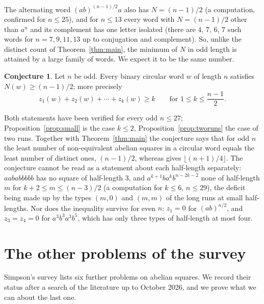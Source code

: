 \documentclass[11pt,reqno]{amsart}
\theoremstyle{definition}
\newtheorem{conjecture}[theorem]{Conjecture}
\newcommand{\fl}[1]{\lfloor #1\rfloor}
\begin{document}
The alternating word $(ab)^{(n-1)/2}a$ also has $N=(n-1)/2$ (a computation, confirmed for $n\le 25$), and for $n\le 13$ every word with $N=(n-1)/2$ other than $a^n$ and its complement has one letter isolated (there are $4$, $7$, $6$, $7$ such words for $n=7,9,11,13$ up to conjugation and complement). So, unlike the distinct count of Theorem~\ref{thm:main}, the minimum of $N$ in odd length is attained by a large family of words. We expect it to be the same number.

\begin{conjecture}\label{conj:odd}
Let $n$ be odd. Every binary circular word $w$ of length $n$ satisfies $N(w)\ge(n-1)/2$; more precisely
\[
z_1(w)+z_2(w)+\cdots+z_k(w)\ge k\qquad\text{for }1\le k\le\frac{n-1}{2}.
\]
\end{conjecture}

Both statements have been verified for every odd $n\le 27$; Proposition~\ref{prop:small} is the case $k\le 2$, Proposition~\ref{prop:tworuns} the case of two runs. Together with Theorem~\ref{thm:main} the conjecture says that for odd $n$ the least number of non-equivalent abelian squares in a circular word equals the least number of distinct ones, $(n-1)/2$, whereas \cite{FSP97} gives $\fl{(n+1)/4}$. The conjecture cannot be read as a statement about each half-length separately: $aababbbbb$ has no square of half-length $3$, and $a^{k+1}ba^kb^{n-2k-2}$ none of half-length $m$ for $k+2\le m\le(n-3)/2$ (a computation for $k\le 6$, $n\le 29$), the deficit being made up by the types $(m,0)$ and $(m,m)$ of the long runs at small half-lengths. Nor does the inequality survive for even $n$: $z_1=0$ for $(ab)^{n/2}$, and $z_3=z_4=0$ for $a^3b^3a^3b^5$, which has only three types of half-length at most four.


\section{The other problems of the survey}\label{sec:others}

Simpson's survey \cite{Sim18} lists six further problems on abelian squares. We record their status after a search of the literature up to October 2026, and we prove what we can about the last one.
\end{document}
